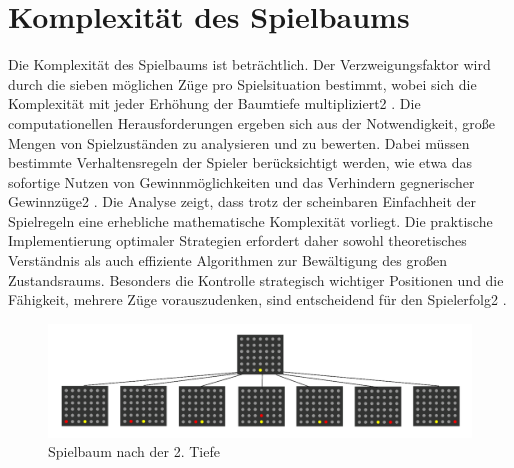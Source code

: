 \section{Komplexität des Spielbaums}
Die Komplexität des Spielbaums ist beträchtlich. Der Verzweigungsfaktor wird durch die sieben möglichen Züge pro Spielsituation bestimmt, wobei sich die Komplexität mit jeder Erhöhung der Baumtiefe multipliziert2
. Die computationellen Herausforderungen ergeben sich aus der Notwendigkeit, große Mengen von Spielzuständen zu analysieren und zu bewerten. Dabei müssen bestimmte Verhaltensregeln der Spieler berücksichtigt werden, wie etwa das sofortige Nutzen von Gewinnmöglichkeiten und das Verhindern gegnerischer Gewinnzüge2
. Die Analyse zeigt, dass trotz der scheinbaren Einfachheit der Spielregeln eine erhebliche mathematische Komplexität vorliegt. Die praktische Implementierung optimaler Strategien erfordert daher sowohl theoretisches Verständnis als auch effiziente Algorithmen zur Bewältigung des großen Zustandsraums. Besonders die Kontrolle strategisch wichtiger Positionen und die Fähigkeit, mehrere Züge vorauszudenken, sind entscheidend für den Spielerfolg2
.
\begin{figure}[H]
	\centering
	\includegraphics[width=0.7\linewidth]{"images/Bildschirmfoto 2025-01-07 um 12.01.00"}
	\caption{Spielbaum nach der 2. Tiefe}
	\label{fig:bildschirmfoto-2025-01-07-um-12}
\end{figure}
	